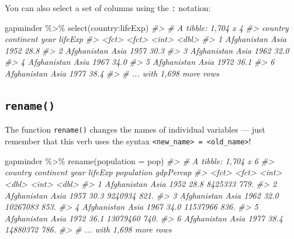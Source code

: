 \documentclass[
]{book}
\newenvironment{Shaded}{\begin{snugshade}}{\end{snugshade}}
\newcommand{\AttributeTok}[1]{\textcolor[rgb]{0.77,0.63,0.00}{#1}}
\newcommand{\CommentTok}[1]{\textcolor[rgb]{0.56,0.35,0.01}{\textit{#1}}}
\newcommand{\FunctionTok}[1]{\textcolor[rgb]{0.00,0.00,0.00}{#1}}
\newcommand{\NormalTok}[1]{#1}
\newcommand{\SpecialCharTok}[1]{\textcolor[rgb]{0.00,0.00,0.00}{#1}}
\begin{document}
You can also select a set of columns using the \texttt{:} notation:

\begin{Shaded}
\begin{Highlighting}[]
\NormalTok{gapminder }\SpecialCharTok{\%\textgreater{}\%} \FunctionTok{select}\NormalTok{(country}\SpecialCharTok{:}\NormalTok{lifeExp)}
\CommentTok{\#\textgreater{} \# A tibble: 1,704 x 4}
\CommentTok{\#\textgreater{}   country     continent  year lifeExp}
\CommentTok{\#\textgreater{}   \textless{}fct\textgreater{}       \textless{}fct\textgreater{}     \textless{}int\textgreater{}   \textless{}dbl\textgreater{}}
\CommentTok{\#\textgreater{} 1 Afghanistan Asia       1952    28.8}
\CommentTok{\#\textgreater{} 2 Afghanistan Asia       1957    30.3}
\CommentTok{\#\textgreater{} 3 Afghanistan Asia       1962    32.0}
\CommentTok{\#\textgreater{} 4 Afghanistan Asia       1967    34.0}
\CommentTok{\#\textgreater{} 5 Afghanistan Asia       1972    36.1}
\CommentTok{\#\textgreater{} 6 Afghanistan Asia       1977    38.4}
\CommentTok{\#\textgreater{} \# ... with 1,698 more rows}
\end{Highlighting}
\end{Shaded}

\hypertarget{rename}{%
\subsection*{\texorpdfstring{\texttt{rename()}}{rename()}}\label{rename}}

The function \texttt{rename()} changes the names of individual variables --- just remember that this verb uses the syntax \texttt{\textless{}new\_name\textgreater{}\ =\ \textless{}old\_name\textgreater{}}!

\begin{Shaded}
\begin{Highlighting}[]
\NormalTok{gapminder }\SpecialCharTok{\%\textgreater{}\%} \FunctionTok{rename}\NormalTok{(}\AttributeTok{population =}\NormalTok{ pop)}
\CommentTok{\#\textgreater{} \# A tibble: 1,704 x 6}
\CommentTok{\#\textgreater{}   country     continent  year lifeExp population gdpPercap}
\CommentTok{\#\textgreater{}   \textless{}fct\textgreater{}       \textless{}fct\textgreater{}     \textless{}int\textgreater{}   \textless{}dbl\textgreater{}      \textless{}int\textgreater{}     \textless{}dbl\textgreater{}}
\CommentTok{\#\textgreater{} 1 Afghanistan Asia       1952    28.8    8425333      779.}
\CommentTok{\#\textgreater{} 2 Afghanistan Asia       1957    30.3    9240934      821.}
\CommentTok{\#\textgreater{} 3 Afghanistan Asia       1962    32.0   10267083      853.}
\CommentTok{\#\textgreater{} 4 Afghanistan Asia       1967    34.0   11537966      836.}
\CommentTok{\#\textgreater{} 5 Afghanistan Asia       1972    36.1   13079460      740.}
\CommentTok{\#\textgreater{} 6 Afghanistan Asia       1977    38.4   14880372      786.}
\CommentTok{\#\textgreater{} \# ... with 1,698 more rows}
\end{Highlighting}
\end{Shaded}
\end{document}
